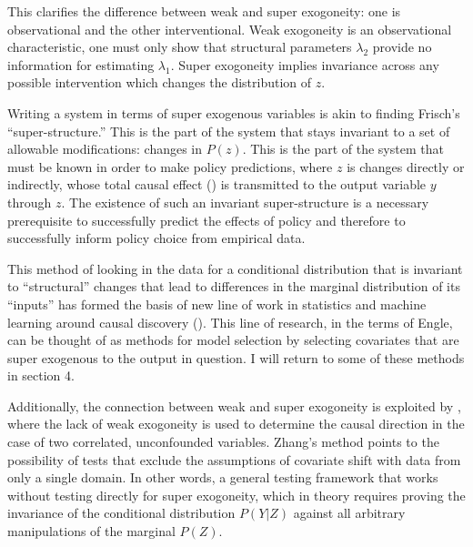 \documentclass[a4paper,12pt]{article}
\begin{document}
This clarifies the difference between weak and super exogoneity: one is observational and the other interventional. Weak exogoneity is an observational characteristic, one must only show that structural parameters $\lambda_2$ provide no information for estimating $\lambda_1$. Super exogoneity implies invariance across any possible intervention which changes the distribution of $z$.

Writing a system in terms of super exogenous variables is akin to finding Frisch's ``super-structure.'' This is the part of the system that stays invariant to a set of allowable modifications: changes in $P(z)$. This is the part of the system that must be known in order to make policy predictions, where $z$ is changes directly or indirectly, whose total causal effect (\cite[in the sense of][]{Pearl2000}) is transmitted to the output variable $y$ through $z$. The existence of such an invariant super-structure is a necessary prerequisite to successfully predict the effects of policy and therefore to successfully inform policy choice from empirical data.

This method of looking in the data for a conditional distribution that is invariant to ``structural'' changes that lead to differences in the marginal distribution of its ``inputs'' has formed the basis of new line of work in statistics and machine learning around causal discovery (\cite{Peters2015, Heinze-deml2017, Rojas-carulla2018}). This line of research, in the terms of Engle, can be thought of as methods for model selection by selecting covariates that are super exogenous to the output in question. I will return to some of these methods in section 4.

Additionally, the connection between weak and super exogoneity is exploited by \cite{Zhang2015}, where the lack of weak exogoneity is used to determine the causal direction in the case of two correlated, unconfounded variables. Zhang's method points to the possibility of tests that exclude the assumptions of covariate shift with data from only a single domain. In other words, a general testing framework that works without testing directly for super exogoneity, which in theory requires proving the invariance of the conditional distribution $P(Y|Z)$ against all arbitrary manipulations of the marginal $P(Z)$.

\end{document}
